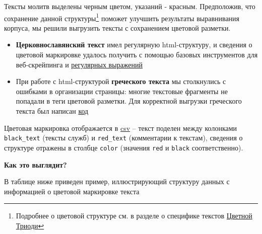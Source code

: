 \documentclass[
  letterpaper,
]{book}
\begin{document}
Тексты молитв выделены черным цветом, указаний - красным. Предположив,
что сохранение данной структуры\footnote{Подробнее о цветовой структуре
  см. в разделе о специфике текстов
  \protect\hyperlink{sec-func_structure}{Цветной Триоди}} поможет
улучшить результаты выравнивания корпуса, мы решили выгрузить тексты с
сохранением цветовой разметки.

\begin{itemize}
\item
  \textbf{Церковнославянский текст} имел регулярную html-структуру, и
  сведения о цветовой маркировке удалось получить с помощью базовых
  инструментов для веб-скрейпинга и
  \href{https://github.com/Drozhzhinastya/GSPC/blob/main/scripts/scraping/md_to_csv_csl.ipynb}{регулярных
  выражений}
\item
  При работе с html-структурой \textbf{греческого текста} мы столкнулись
  с ошибками в организации страницы: многие текстовые фрагменты не
  попадали в теги цветовой разметки. Для корректной выгрузки греческого
  текста был написан
  \href{https://github.com/Drozhzhinastya/GSPC/blob/main/scripts/scraping/scrape_grc.ipynb}{код}
\end{itemize}

Цветовая маркировка отображается в
\href{https://github.com/Drozhzhinastya/GSPC/tree/main/csv/markup}{csv}
-- текст поделен между колонками \texttt{black\_text} (тексты служб) и
\texttt{red\_text} (комментарии к текстам), сведения о структуре
отражены в столбце \texttt{color} (значения \texttt{red} и
\texttt{black} соответственно).

\begin{tcolorbox}[enhanced jigsaw, rightrule=.15mm, breakable, colframe=quarto-callout-note-color-frame, colback=white, leftrule=.75mm, left=2mm, arc=.35mm, opacityback=0, toprule=.15mm, bottomrule=.15mm]

\textbf{Как это выглядит?}\vspace{2mm}

В таблице ниже приведен пример, иллюстрирующий структуру данных с
информацией о цветовой маркировке текста

\end{tcolorbox}
\end{document}
